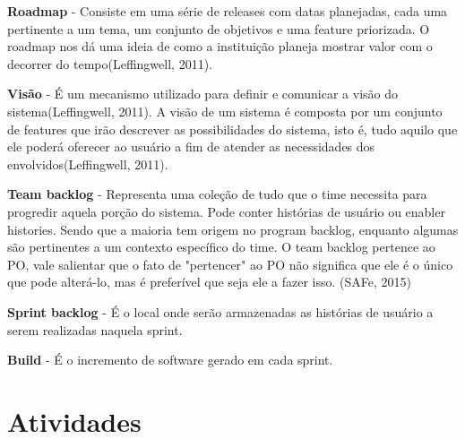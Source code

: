 \textbf{Roadmap} - Consiste em uma série de releases com datas planejadas, cada uma pertinente a um tema, um conjunto de objetivos e uma feature priorizada. O roadmap nos dá uma ideia de como a instituição planeja mostrar valor com o decorrer do tempo(Leffingwell, 2011).

\textbf{Visão} - É um mecanismo utilizado para definir e comunicar a visão do sistema(Leffingwell, 2011). A visão de um sistema é composta por um conjunto de features que irão descrever as possibilidades do sistema, isto é, tudo aquilo que ele poderá oferecer ao usuário a fim de atender as necessidades dos envolvidos(Leffingwell, 2011).

\textbf{Team backlog} - Representa uma coleção de tudo que o time necessita para progredir aquela porção do sistema. Pode conter histórias de usuário ou enabler histories. Sendo que a maioria tem origem no program backlog, enquanto algumas são pertinentes a um contexto específico do time. O team backlog pertence ao PO, vale salientar que o fato de "pertencer" ao PO não significa que ele é o único que pode alterá-lo, mas é preferível que seja ele a fazer isso. (SAFe, 2015)

\textbf{Sprint backlog} - É o local onde serão armazenadas as histórias de usuário a serem realizadas naquela sprint.

\textbf{Build} - É o incremento de software gerado em cada sprint.

\section{Atividades}

